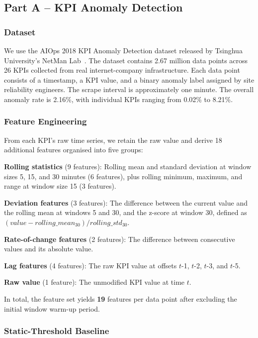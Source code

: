 \documentclass[10pt,twocolumn]{article}
\begin{document}
\subsection{Part A -- KPI Anomaly Detection}

\subsubsection{Dataset}

We use the AIOps 2018 KPI Anomaly Detection dataset released by Tsinghua University's NetMan Lab~\cite{aiops2018}. The dataset contains 2.67 million data points across 26 KPIs collected from real internet-company infrastructure. Each data point consists of a timestamp, a KPI value, and a binary anomaly label assigned by site reliability engineers. The scrape interval is approximately one minute. The overall anomaly rate is 2.16\%, with individual KPIs ranging from 0.02\% to 8.21\%.

\subsubsection{Feature Engineering}

From each KPI's raw time series, we retain the raw value and derive 18 additional features organised into five groups:

\textbf{Rolling statistics} (9 features): Rolling mean and standard deviation at window sizes 5, 15, and 30 minutes (6 features), plus rolling minimum, maximum, and range at window size 15 (3 features).

\textbf{Deviation features} (3 features): The difference between the current value and the rolling mean at windows 5 and 30, and the z-score at window 30, defined as $(value - rolling\_mean_{30}) / rolling\_std_{30}$.

\textbf{Rate-of-change features} (2 features): The difference between consecutive values and its absolute value.

\textbf{Lag features} (4 features): The raw KPI value at offsets $t$-1, $t$-2, $t$-3, and $t$-5.

\textbf{Raw value} (1 feature): The unmodified KPI value at time $t$.

In total, the feature set yields \textbf{19} features per data point after excluding the initial window warm-up period.

\subsubsection{Static-Threshold Baseline}
\end{document}
